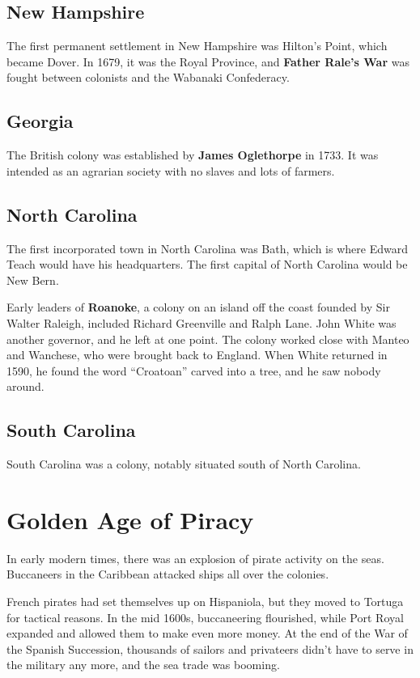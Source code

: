 \subsection*{New Hampshire}

The first permanent settlement in New Hampshire was Hilton's Point, which became Dover.
In 1679, it was the Royal Province,
and \textbf{Father Rale's War} was fought between colonists and the Wabanaki Confederacy.

\subsection*{Georgia}

The British colony was established by \textbf{James Oglethorpe} in 1733.
It was intended as an agrarian society with no slaves and lots of farmers.

\subsection*{North Carolina}

The first incorporated town in North Carolina was Bath,
which is where Edward Teach would have his headquarters.
The first capital of North Carolina would be New Bern.

Early leaders of \textbf{Roanoke}, a colony on an island off the coast founded by Sir Walter Raleigh,
included Richard Greenville and Ralph Lane.
John White was another governor, and he left at one point.
The colony worked close with Manteo and Wanchese, who were brought back to England.
When White returned in 1590, he found the word ``Croatoan'' carved into a tree,
and he saw nobody around.

\subsection*{South Carolina}

South Carolina was a colony, notably situated south of North Carolina.

\section{Golden Age of Piracy}

In early modern times, there was an explosion of pirate activity on the seas.
Buccaneers in the Caribbean attacked ships all over the colonies.

French pirates had set themselves up on Hispaniola,
but they moved to Tortuga for tactical reasons.
In the mid 1600s, buccaneering flourished,
while Port Royal expanded and allowed them to make even more money.
At the end of the War of the Spanish Succession,
thousands of sailors and privateers didn't have to serve in the military any more,
and the sea trade was booming.

